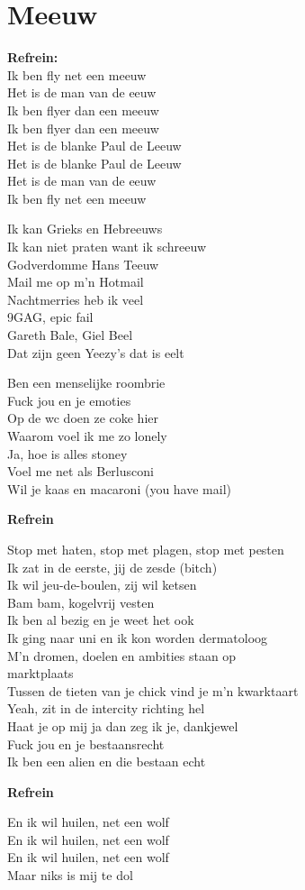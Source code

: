 \section{Meeuw}
\textbf{Refrein:}\\
Ik ben fly net een meeuw\\
Het is de man van de eeuw\\
Ik ben flyer dan een meeuw\\
Ik ben flyer dan een meeuw\\
Het is de blanke Paul de Leeuw\\
Het is de blanke Paul de Leeuw\\
Het is de man van de eeuw\\
Ik ben fly net een meeuw

Ik kan Grieks en Hebreeuws\\
Ik kan niet praten want ik schreeuw\\
Godverdomme Hans Teeuw\\
Mail me op m'n Hotmail\\
Nachtmerries heb ik veel\\
9GAG, epic fail\\
Gareth Bale, Giel Beel\\
Dat zijn geen Yeezy's dat is eelt

Ben een menselijke roombrie\\
Fuck jou en je emoties\\
Op de wc doen ze coke hier\\
Waarom voel ik me zo lonely\\
Ja, hoe is alles stoney\\
Voel me net als Berlusconi\\
Wil je kaas en macaroni (you have mail)

\textbf{Refrein}

Stop met haten, stop met plagen, stop met pesten\\
Ik zat in de eerste, jij de zesde (bitch)\\
Ik wil jeu-de-boulen, zij wil ketsen\\
Bam bam, kogelvrij vesten\\
Ik ben al bezig en je weet het ook\\
Ik ging naar uni en ik kon worden dermatoloog\\
M'n dromen, doelen en ambities staan op\\ marktplaats\\
Tussen de tieten van je chick vind je m'n kwarktaart\\
Yeah, zit in de intercity richting hel\\
Haat je op mij ja dan zeg ik je, dankjewel\\
Fuck jou en je bestaansrecht\\
Ik ben een alien en die bestaan echt

\textbf{Refrein}

En ik wil huilen, net een wolf\\
En ik wil huilen, net een wolf\\
En ik wil huilen, net een wolf\\
Maar niks is mij te dol
